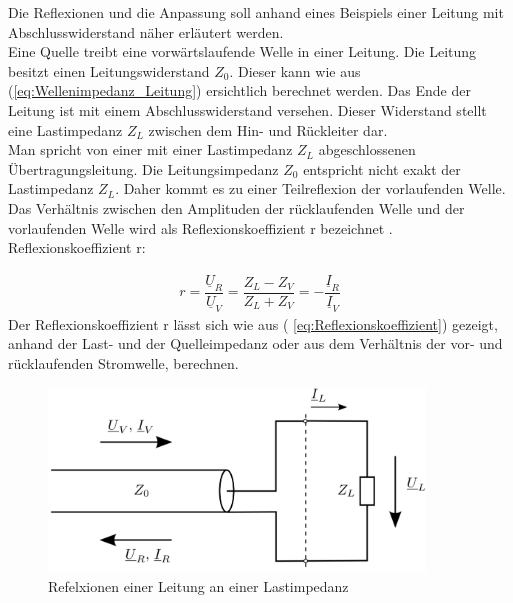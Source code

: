 Die Reflexionen und die Anpassung soll anhand eines Beispiels einer Leitung mit Abschlusswiderstand  näher erläutert werden. \\

Eine Quelle treibt eine vorwärtslaufende Welle in einer Leitung. Die Leitung besitzt einen Leitungswiderstand $Z_0$. Dieser kann wie aus  (\ref{eq:Wellenimpedanz_Leitung}) ersichtlich berechnet werden. Das Ende der Leitung ist mit einem Abschlusswiderstand versehen. Dieser Widerstand stellt eine Lastimpedanz $Z_L$ zwischen dem Hin- und Rückleiter dar. \\
Man spricht von einer mit einer Lastimpedanz $Z_L$ abgeschlossenen Übertragungsleitung.  Die Leitungsimpedanz $Z_0$ entspricht nicht exakt der Lastimpedanz $Z_L$. Daher kommt es zu einer   Teilreflexion der vorlaufenden Welle. Das Verhältnis zwischen den Amplituden der rücklaufenden Welle und der vorlaufenden Welle wird als Reflexionskoeffizient r bezeichnet \cite{Tekom}. \\

Reflexionskoeffizient r:

\begin{eqnarray}\label{eq:Reflexionskoeffizient}
r=\dfrac{\underline{U}_{R}}{\underline{U}_{V}}=\dfrac{Z_{L}-Z_{V}}{Z_{L} + Z_{V}}=-\dfrac{\underline{I}_{R}}{\underline{I}_{V}}
\end{eqnarray}
Der Reflexionskoeffizient r lässt sich wie aus ( \ref{eq:Reflexionskoeffizient}) gezeigt, anhand der Last- und der Quelleimpedanz oder aus dem Verhältnis der vor- und rücklaufenden Stromwelle, berechnen.

\begin{figure}[!ht]
	\centering
	\includegraphics[width=10cm]{content/bilder/ReflexionenLeitungLastimpedanz.pdf}%
	\caption{Refelxionen einer Leitung an einer Lastimpedanz \cite{Tekom}}
	\label{LeitungMit_ZL}
\end{figure}


